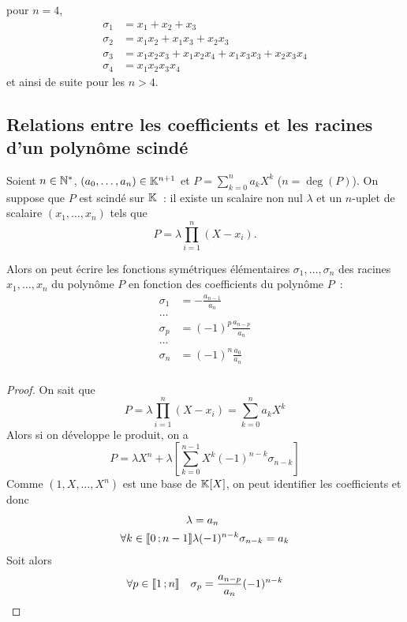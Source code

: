 pour $n=4$, 
\begin{align}
  \sigma_1 &=x_1+x_2+x_3 \\
  \sigma_2 &=x_1x_2+x_1x_3 + x_2x_3 \\
  \sigma_3 &= x_1x_2x_3 +x_1x_2x_4 + x_1x_3x_3 + x_2x_3x_4\\
  \sigma_4 &= x_1x_2x_3x_4
\end{align}
et ainsi de suite pour les $n> 4$.

\subsection[Relation coefficients/racines]{Relations entre les coefficients et les racines d'un polynôme scindé}

\begin{prop}
  Soient $n \in \mathbb{N}^*$, $(a_0, \ldots, a_n) \in \mathbb{K}^{n+1}$ et $P=\sum_{k=0}^n a_k X^k$ ($n=\deg(P)$). On suppose que $P$ est scindé sur $\mathbb{K}$~: il existe un scalaire non nul $\lambda$ et un $n$-uplet de scalaire $(x_1, \ldots, x_n)$ tels que
  \begin{equation}
    P = \lambda \prod_{i=1}^n (X-x_i).
  \end{equation}

  Alors on peut écrire les fonctions symétriques élémentaires $\sigma_1, \ldots, \sigma_n$ des racines $x_1, \ldots, x_n$ du polynôme $P$ en fonction des coefficients du polynôme $P$~:
  \begin{align}
    \sigma_1 &= - \frac{a_{n-1}}{a_n} \\
    \ldots\\
    \sigma_p &= (-1)^p \frac{a_{n-p}}{a_n} \\
    \ldots\\
    \sigma_n &= (-1)^n \frac{a_{0}}{a_n} \\
  \end{align}
\end{prop}

\begin{proof}
  On sait que
  \begin{equation}
    P = \lambda \prod_{i=1}^n (X-x_i) = \sum_{k=0}^n a_k X^k
  \end{equation}
  Alors si on développe le produit, on a
  \begin{equation}
    P = \lambda X^n + \lambda \left[ \sum_{k=0}^{n-1} X^k (-1)^{n-k} \sigma_{n-k} \right]
  \end{equation}
  Comme $(1,X, \ldots, X^n)$ est une base de $\mathbb{K}[X]$, on peut identifier les coefficients et donc
  \begin{align}
    \lambda &= a_n \\
    \forall k \in \mathopen{\llbracket}0\mathclose{}\mathpunct{};n-1\mathclose{\rrbracket} & \lambda (-1)^{n-k} \sigma_{n-k} = a_k 
  \end{align}
  Soit alors
  \begin{equation}
    \forall p \in \mathopen{\llbracket}1\mathclose{}\mathpunct{};n\mathclose{\rrbracket} \quad \sigma_p = \frac{a_{n-p}}{a_n} (-1)^{n-k}
  \end{equation}
\end{proof}

